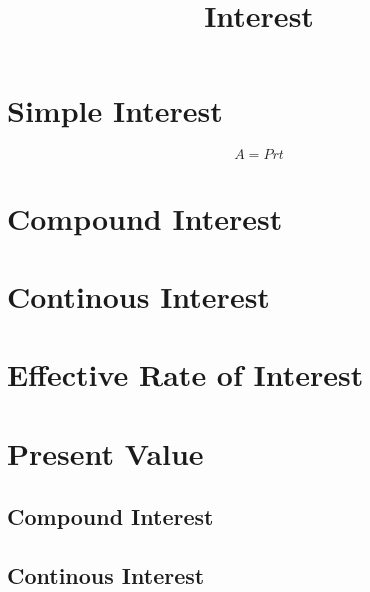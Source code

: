 \documentclass{article}
\title{Interest}
\author{}
\date{}
\begin{document}
	
	\maketitle{}
	
	\section{Simple Interest}
	
	\begin{equation}
	    A = Prt
	    
	\end{equation}
	
	\section{Compound Interest}
	
	\section{Continous Interest}
	
	\section{Effective Rate of Interest}
	
	\section{Present Value}
	
	    \subsection{Compound Interest}
	    
	    \subsection{Continous Interest}
\end{document}
